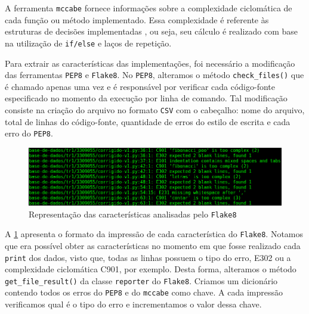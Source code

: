 %	
	
		A ferramenta \texttt{mccabe} \cite{mccabe2013} fornece informações sobre a
		complexidade ciclomática \cite{mccabe} de cada função ou método implementado.
		Essa complexidade é referente às estruturas de decisões implementadas \cite{mccabe},
		ou seja, seu cálculo é realizado com base na utilização de \texttt{if/else} e laços
		de repetição.
		
		Para extrair as características das implementações, foi necessário a modificação
		das ferramentas \texttt{PEP8} e \texttt{Flake8}. No \texttt{PEP8}, alteramos o
		método \texttt{check\_files()} que é chamado apenas uma vez e é responsável por
		verificar cada código-fonte especificado no momento da execução por linha de
		comando. Tal modificação consiste na criação do arquivo no formato \texttt{CSV}
		com o cabeçalho: nome do arquivo, total de linhas do código-fonte, quantidade
		de erros do estilo de escrita e cada erro do \texttt{PEP8}.
		
		\begin{figure}[h]
			\centering
			\includegraphics[width=1\linewidth]{imagem/flake8}
			\caption{Representação das características analisadas pelo \texttt{Flake8}}
			\label{fig:flake8}
		\end{figure}
		
		A \cref{fig:flake8} apresenta o formato da impressão de cada característica do
		\texttt{Flake8}. Notamos que era possível obter as características no momento em
		que fosse realizado cada \texttt{print} dos dados, visto que, todas as linhas
		possuem o tipo do erro, E302 ou a complexidade ciclomática C901, por exemplo.
		Desta forma, alteramos o método \texttt{get\_file\_result()} da classe
		\texttt{reporter} do \texttt{Flake8}. Criamos um dicionário contendo todos os
		erros do \texttt{PEP8} e do \texttt{mccabe} como chave. A cada impressão
		verificamos qual é o tipo do erro e incrementamos o valor dessa chave.
		
